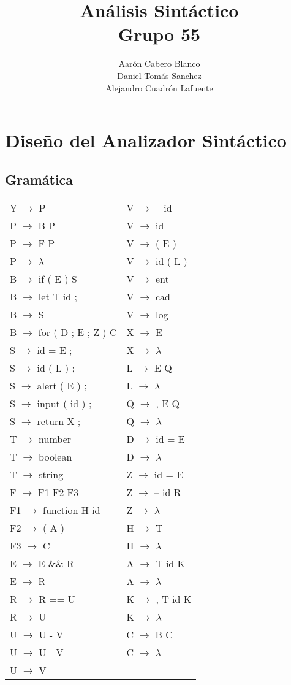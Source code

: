 \documentclass[12pt, a4paper, titlepage]{article}
\title{Análisis Sintáctico \\ \small{Grupo 55}}
\author{Aarón Cabero Blanco \\ Daniel Tomás Sanchez \\ Alejandro Cuadrón Lafuente}
\begin{document}
\maketitle
\tableofcontents
\clearpage


\section{Diseño del Analizador Sintáctico}
\subsection{Gramática}
\label{subsec:grammar}
\noindent
\begin{tabular}{ l l }
  Y $\rightarrow$ P & V $\rightarrow$ -- id \\
  P $\rightarrow$ B P & V $\rightarrow$ id \\
  P $\rightarrow$ F P & V $\rightarrow$ ( E ) \\
  P $\rightarrow$ $\lambda$ & V $\rightarrow$ id ( L ) \\
  B $\rightarrow$ if ( E ) S & V $\rightarrow$ ent \\
  B $\rightarrow$ let T id ; & V $\rightarrow$ cad \\ 
  B $\rightarrow$ S & V $\rightarrow$ log \\
  B $\rightarrow$ for ( D ; E ; Z ) { C } & X $\rightarrow$ E \\
  S $\rightarrow$ id = E ; & X $\rightarrow$ $\lambda$  \\
  S $\rightarrow$ id ( L ) ; & L $\rightarrow$ E Q \\
  S $\rightarrow$ alert ( E ) ; & L $\rightarrow$ $\lambda$ \\
  S $\rightarrow$ input ( id ) ; & Q $\rightarrow$ , E Q\\
  S $\rightarrow$ return X ; & Q $\rightarrow$ $\lambda$ \\
  T $\rightarrow$ number & D $\rightarrow$ id = E \\
  T $\rightarrow$ boolean & D $\rightarrow$ $\lambda$ \\
  T $\rightarrow$ string & Z $\rightarrow$ id = E \\
  F $\rightarrow$ F1 F2 F3 & Z $\rightarrow$ -- id R \\
  F1 $\rightarrow$ function H id & Z $\rightarrow$ $\lambda$ \\
  F2 $\rightarrow$ ( A ) & H $\rightarrow$ T \\
  F3 $\rightarrow$ { C } & H $\rightarrow$ $\lambda$ \\
  E $\rightarrow$ E \&\& R & A $\rightarrow$ T id K \\
  E $\rightarrow$ R & A $\rightarrow$ $\lambda$ \\
  R $\rightarrow$ R == U & K $\rightarrow$ , T id K \\
  R $\rightarrow$ U & K $\rightarrow$ $\lambda$ \\
  U $\rightarrow$ U - V & C $\rightarrow$ B C \\
  U $\rightarrow$ U - V & C $\rightarrow$ $\lambda$ \\
  U $\rightarrow$ V
\end{tabular}
\end{document}
